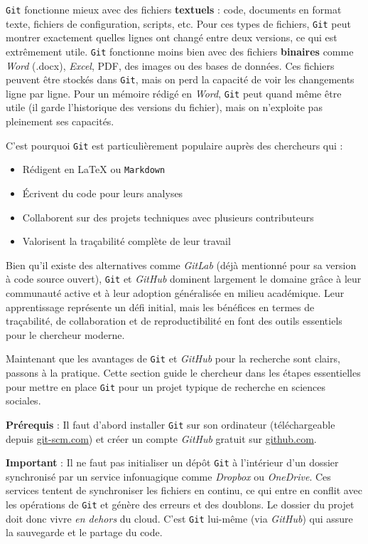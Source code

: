 \documentclass[
  letterpaper,
  DIV=11,
  numbers=noendperiod,
  oneside]{scrreprt}
\providecommand{\tightlist}{%
  \setlength{\itemsep}{0pt}\setlength{\parskip}{0pt}}\usepackage{longtable,booktabs,array}
\begin{document}
\texttt{Git} fonctionne mieux avec des fichiers \textbf{textuels} :
code, documents en format texte, fichiers de configuration, scripts,
etc. Pour ces types de fichiers, \texttt{Git} peut montrer exactement
quelles lignes ont changé entre deux versions, ce qui est extrêmement
utile. \texttt{Git} fonctionne moins bien avec des fichiers
\textbf{binaires} comme \emph{Word} (.docx), \emph{Excel}, PDF, des
images ou des bases de données. Ces fichiers peuvent être stockés dans
\texttt{Git}, mais on perd la capacité de voir les changements ligne par
ligne. Pour un mémoire rédigé en \emph{Word}, \texttt{Git} peut quand
même être utile (il garde l'historique des versions du fichier), mais on
n'exploite pas pleinement ses capacités.

C'est pourquoi \texttt{Git} est particulièrement populaire auprès des
chercheurs qui :

\begin{itemize}
\tightlist
\item
  Rédigent en \LaTeX{} ou \texttt{Markdown}
\item
  Écrivent du code pour leurs analyses
\item
  Collaborent sur des projets techniques avec plusieurs contributeurs
\item
  Valorisent la traçabilité complète de leur travail
\end{itemize}

Bien qu'il existe des alternatives comme \emph{GitLab} (déjà mentionné
pour sa version à code source ouvert), \texttt{Git} et \emph{GitHub}
dominent largement le domaine grâce à leur communauté active et à leur
adoption généralisée en milieu académique. Leur apprentissage représente
un défi initial, mais les bénéfices en termes de traçabilité, de
collaboration et de reproductibilité en font des outils essentiels pour
le chercheur moderne.

Maintenant que les avantages de \texttt{Git} et \emph{GitHub} pour la
recherche sont clairs, passons à la pratique. Cette section guide le
chercheur dans les étapes essentielles pour mettre en place \texttt{Git}
pour un projet typique de recherche en sciences sociales.

\textbf{Prérequis} : Il faut d'abord installer \texttt{Git} sur son
ordinateur (téléchargeable depuis
\href{https://git-scm.com}{git-scm.com}) et créer un compte
\emph{GitHub} gratuit sur \href{https://github.com}{github.com}.

\textbf{Important} : Il ne faut pas initialiser un dépôt \texttt{Git} à
l'intérieur d'un dossier synchronisé par un service infonuagique comme
\emph{Dropbox} ou \emph{OneDrive}. Ces services tentent de synchroniser
les fichiers en continu, ce qui entre en conflit avec les opérations de
\texttt{Git} et génère des erreurs et des doublons. Le dossier du projet
doit donc vivre \emph{en dehors} du cloud. C'est \texttt{Git} lui-même
(via \emph{GitHub}) qui assure la sauvegarde et le partage du code.
\end{document}
